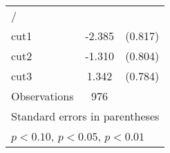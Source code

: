 \begin{table}[htbp]
\begin{tabular}{l*{1}{cc}}
\hline
/                   &                     &            \\
cut1                &      -2.385\sym{***}&     (0.817)\\
cut2                &      -1.310         &     (0.804)\\
cut3                &       1.342\sym{*}  &     (0.784)\\
\hline
Observations        &         976         &            \\
\hline\hline
\multicolumn{3}{l}{\footnotesize Standard errors in parentheses}\\
\multicolumn{3}{l}{\footnotesize \sym{*} \(p<0.10\), \sym{**} \(p<0.05\), \sym{***} \(p<0.01\)}\\
\end{tabular}
\end{table}
